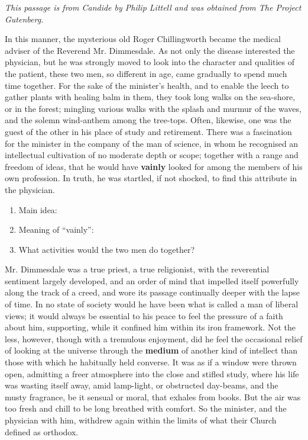 \documentclass[12pt]{book}
\renewcommand{\indent}{\hspace{1cm}}
\begin{document}
\textit{This passage is from Candide by  Philip Littell and was obtained from The Project Gutenberg.}

\hrulefill

\bigskip
\begin{linenumbers*}
\modulolinenumbers[5]
\indent In this manner, the mysterious old Roger Chillingworth became the medical adviser of the Reverend Mr. Dimmesdale. As not only the disease interested the physician, but he was strongly moved to look into the character and qualities of the patient, these two men, so different in age, came gradually to spend much time together. For the sake of the minister's health, and to enable the leech to gather plants with healing balm in them, they took long walks on the sea-shore, or in the forest; mingling various walks with the splash and murmur of the waves, and the solemn wind-anthem among the tree-tops. Often, likewise, one was the guest of the other in his place of study and retirement. There was a fascination for the minister in the company of the man of science, in whom he recognised an intellectual cultivation of no moderate depth or scope; together with a range and freedom of ideas, that he would have \textbf{vainly} looked for among the members of his own profession. In truth, he was startled, if not shocked, to find this attribute in the physician.
\end{linenumbers*}

\begin{enumerate}
\item Main idea: \hrulefill
\item Meaning of ``vainly'': \hrulefill
\item What activities would the two men do together? \hrulefill
\end{enumerate}

\begin{linenumbers}
\modulolinenumbers[5]
\indent Mr. Dimmesdale was a true priest, a true religionist, with the reverential sentiment largely developed, and an order of mind that impelled itself powerfully along the track of a creed, and wore its passage continually deeper with the lapse of time. In no state of society would he have been what is called a man of liberal views; it would always be essential to his peace to feel the pressure of a faith about him, supporting, while it confined him within its iron framework. Not the less, however, though with a tremulous enjoyment, did he feel the occasional relief of looking at the universe through the \textbf{medium} of another kind of intellect than those with which he habitually held converse. It was as if a window were thrown open, admitting a freer atmosphere into the close and stifled study, where his life was wasting itself away, amid lamp-light, or obstructed day-beams, and the musty fragrance, be it sensual or moral, that exhales from books. But the air was too fresh and chill to be long breathed with comfort. So the minister, and the physician with him, withdrew again within the limits of what their Church defined as orthodox.
\end{linenumbers}
\end{document}
